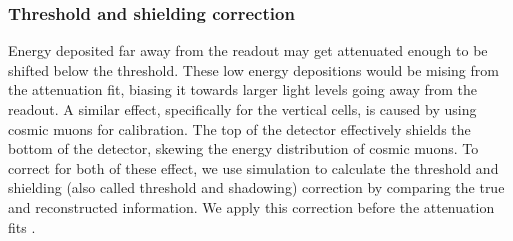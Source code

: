 \documentclass[12pt,a4paper]{article}
\begin{document}
\subsubsection*{Threshold and shielding correction}

Energy deposited far away from the readout may get attenuated enough to be shifted below the threshold. These low energy depositions would be mising from the attenuation fit, biasing it towards larger light levels going away from the readout. A similar effect, specifically for the vertical cells, is caused by using cosmic muons for calibration. The top of the detector effectively shields the bottom of the detector, skewing the energy distribution of cosmic muons. To correct for both of these effect, we use simulation to calculate the threshold and shielding (also called threshold and shadowing) correction by comparing the true and reconstructed information. We apply this correction before the attenuation fits \cite{NOVA-doc-13579-SAAttenuationAndThreshold}.

\end{document}
